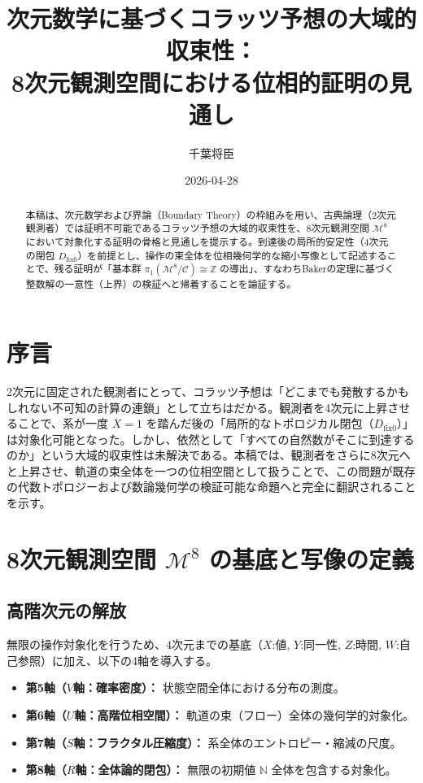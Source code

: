 \documentclass[11pt,a4paper]{article}
\newcommand{\dfix}{D_{\mathrm{fix}0}}
\theoremstyle{definition}
\begin{document}
\title{次元数学に基づくコラッツ予想の大域的収束性：\\8次元観測空間における位相的証明の見通し}
\author{千葉将臣}
\date{2026-04-28}
\maketitle

\begin{abstract}
本稿は、次元数学および界論（Boundary Theory）の枠組みを用い、古典論理（2次元観測者）では証明不可能であるコラッツ予想の大域的収束性を、8次元観測空間 $\mathcal{M}^8$ において対象化する証明の骨格と見通しを提示する。到達後の局所的安定性（4次元の閉包 $\dfix$）を前提とし、操作の束全体を位相幾何学的な縮小写像として記述することで、残る証明が「基本群 $\pi_1(\mathcal{M}^8 / \mathcal{C}) \cong \mathbb{Z}$ の導出」、すなわちBakerの定理に基づく整数解の一意性（上界）の検証へと帰着することを論証する。
\end{abstract}

\section*{序言}
2次元に固定された観測者にとって、コラッツ予想は「どこまでも発散するかもしれない不可知の計算の連鎖」として立ちはだかる。観測者を4次元に上昇させることで、系が一度 $X=1$ を踏んだ後の「局所的なトポロジカル閉包（$\dfix$）」は対象化可能となった。しかし、依然として「すべての自然数がそこに到達するのか」という大域的収束性は未解決である。本稿では、観測者をさらに8次元へと上昇させ、軌道の束全体を一つの位相空間として扱うことで、この問題が既存の代数トポロジーおよび数論幾何学の検証可能な命題へと完全に翻訳されることを示す。

\section{8次元観測空間 $\mathcal{M}^8$ の基底と写像の定義}

\subsection{高階次元の解放}
無限の操作対象化を行うため、4次元までの基底（$X$:値, $Y$:同一性, $Z$:時間, $W$:自己参照）に加え、以下の4軸を導入する。
\begin{itemize}
    \item \textbf{第5軸（$V$軸：確率密度）：} 状態空間全体における分布の測度。
    \item \textbf{第6軸（$U$軸：高階位相空間）：} 軌道の束（フロー）全体の幾何学的対象化。
    \item \textbf{第7軸（$S$軸：フラクタル圧縮度）：} 系全体のエントロピー・縮減の尺度。
    \item \textbf{第8軸（$R$軸：全体論的閉包）：} 無限の初期値 $\mathbb{N}$ 全体を包含する対象化。
\end{itemize}
\end{document}
